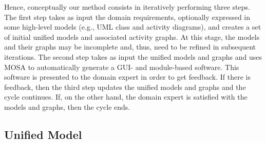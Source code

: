 Hence, conceptually our method consists in iteratively performing three steps. The first step takes as input the domain requirements, optionally expressed in some high-level models (e.g., UML class and activity diagrams), and creates a set of initial unified models and associated activity graphs. At this stage, the models and their graphs may be incomplete and, thus, need to be refined in subsequent iterations. The second step takes as input the unified models and graphs and uses MOSA to automatically generate a GUI- and module-based software. This software is presented to the domain expert in order to get feedback. If there is feedback, then the third step updates the unified models and graphs and the cycle continues. If, on the other hand, the domain expert is satisfied with the models and graphs, then the cycle ends.

\subsection{Unified Model}

